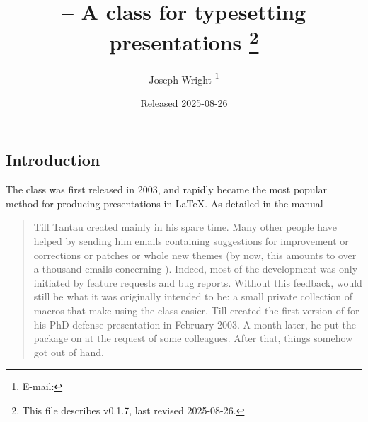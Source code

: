 \documentclass{l3doc}
\makeatletter
\let\acro\@firstofone
\def\filedate{2025-08-26}
\def\fileversion{v0.1.7}
\makeatother
\begin{document}
\title{%
   -- A class for typesetting presentations%
  \thanks{This file describes \fileversion,
    last revised \filedate.}%
}

\author{%
  Joseph Wright%
  \thanks{%
    E-mail: %
  }%
}

\date{Released \filedate}

\maketitle

\tableofcontents

\begin{documentation}

\section{Introduction%
  \label{sec:intro}}

The  class was first released in 2003, and rapidly became the
most popular method for producing presentations in \LaTeX{}. As detailed in
the  manual
\begin{quotation}
  Till Tantau created  mainly in his spare time. Many other people
  have helped by sending him emails containing suggestions for improvement or
  corrections or patches or whole new themes (by now, this amounts to over a
  thousand emails concerning ). Indeed, most of the development was
  only initiated by feature requests and bug reports. Without this feedback,
   would still be what it was originally intended to be: a small
  private collection of macros that make using the  class easier.
  Till created the first version of  for his PhD defense
  presentation in February 2003. A month later, he put the package on
  \acro{ctan} at the request of some colleagues. After that, things somehow got
  out of hand.
\end{quotation}


\end{documentation}
\end{document}
